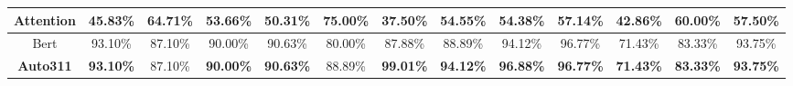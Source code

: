 \begin{table}[]
\begin{tabular}{||c|cccc|cccc|cccc||}
Attention     & \multicolumn{1}{c|}{45.83\%}           & \multicolumn{1}{c|}{64.71\%}           & \multicolumn{1}{c|}{53.66\%}          & 50.31\%          & \multicolumn{1}{c|}{75.00\%} & \multicolumn{1}{c|}{37.50\%}           & \multicolumn{1}{c|}{54.55\%}          & 54.38\%          & \multicolumn{1}{c|}{57.14\%} & \multicolumn{1}{c|}{42.86\%}           & \multicolumn{1}{c|}{60.00\%}          & 57.50\%          \\ \hline
Bert          & \multicolumn{1}{c|}{93.10\%}  & \multicolumn{1}{c|}{87.10\%}           & \multicolumn{1}{c|}{90.00\%} & 90.63\% & \multicolumn{1}{c|}{80.00\%} & \multicolumn{1}{c|}{87.88\%}           & \multicolumn{1}{c|}{88.89\%} & 94.12\% & \multicolumn{1}{c|}{96.77\%} & \multicolumn{1}{c|}{71.43\%}  & \multicolumn{1}{c|}{83.33\%} & 93.75\% \\ \hline
\textbf{Auto311}          & \multicolumn{1}{c|}{\textbf{93.10\%}}  & \multicolumn{1}{c|}{87.10\%}           & \multicolumn{1}{c|}{\textbf{90.00\%}} & \textbf{90.63\%} & \multicolumn{1}{c|}{88.89\%}           & \multicolumn{1}{c|}{\textbf{99.01\%}}           & \multicolumn{1}{c|}{\textbf{94.12\%}} & \textbf{96.88\%} & \multicolumn{1}{c|}{\textbf{96.77\%}}  & \multicolumn{1}{c|}{\textbf{71.43\%}}           & \multicolumn{1}{c|}{\textbf{83.33\%}} & \textbf{93.75\%} \\ \hline\hline


\end{tabular}
\end{table}
